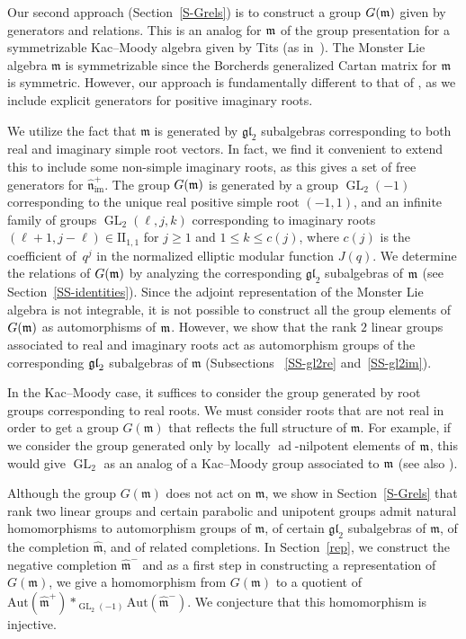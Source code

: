 \documentclass[11pt,letterpaper]{amsart}
\numberwithin{thecounter}{section}
\theoremstyle{definition}
\DeclareMathOperator{\GL}{GL}
\DeclareMathOperator{\ad}{ad}
\DeclareMathOperator{\im}{{im}}
\newcommand{\nhimp}{{\widehat{\mathfrak{n}}_{\im}^+}}
\begin{document}
Our second approach (Section~\ref{S-Grels}) is to construct a group $G(\frak m)$ given by generators and relations.  This is  an analog for $\frak m$ of  the group presentation for a symmetrizable Kac--Moody algebra given by Tits (as in~\cite{Ti87}).  The Monster Lie algebra $\mathfrak{m}$ is symmetrizable since the Borcherds generalized Cartan matrix for $\mathfrak{m}$ is symmetric. However, our approach is fundamentally different to that of \cite{Ti87}, as we include explicit generators for  positive imaginary roots.

We utilize the fact that $\mathfrak m$ is generated by $\mathfrak{gl}_2$ subalgebras corresponding to  both real and imaginary simple root vectors.
In fact, we find it convenient to extend this to include some non-simple imaginary roots, as this gives a set of free generators for $\nhimp$.
The group ${G}(\frak m)$ is generated by a group $\GL_2(-1)$ corresponding to the unique real positive simple root $(-1,1)$,  and an infinite family of groups $\GL_2(\ell,j,k)$ corresponding to imaginary  roots $(\ell+1,j-\ell)\in \text{II}_{1,1}$ for $j\geq 1$ and $1\leq k\leq c(j)$, where $c(j)$ is the coefficient of~$q^j$ in the normalized elliptic modular function $J(q)$. 
We determine the relations of $G(\frak m)$ by analyzing the corresponding $\mathfrak{gl}_2$ subalgebras of $\frak m$ (see Section~\ref{SS-identities}).
Since the adjoint representation of the Monster Lie algebra is not integrable, it is not possible to construct all the group elements of $G(\frak m)$ as automorphisms of $\frak m$. 
However, we show that the  rank \(2\) linear groups associated to
real and imaginary roots act as automorphism groups of the corresponding $\frak{gl}_2$ subalgebras of $\mathfrak{m}$ (Subsections ~\ref{SS-gl2re} and~\ref{SS-gl2im}).

In the Kac--Moody case, it suffices to consider the group generated by root groups corresponding to real roots. We must consider roots that are  not real in order to get a group $G(\mathfrak{m})$ that reflects the full structure of $\mathfrak{m}$.  For example, if we consider the group generated only by  locally $\ad$-nilpotent elements of $\frak{m}$, this would  give $\GL_2$ as an analog of a Kac--Moody group associated to $\frak{m}$ (see also \cite{Kum22}).



Although the group $G(\mathfrak m)$ does not act on $\mathfrak m$, 
we show in Section~\ref{S-Grels} that  rank two linear groups and certain
parabolic and unipotent groups admit natural homomorphisms to
automorphism groups of $\mathfrak m$, of certain
$\mathfrak{gl}_2$ subalgebras of $\mathfrak m$, of the completion
$\widehat{\mathfrak m}$, and of related completions.
In Section~\ref{rep}, we construct the negative completion $\widehat{\mathfrak{m}}^-$ and as a first step in  constructing a representation of $G(\mathfrak{m})$, we give a homomorphism from $G(\mathfrak{m})$ to a quotient of $\text{Aut}(\widehat{\mathfrak{m}}^+) *_{\GL_2(-1)} \text{Aut}(\widehat{\mathfrak{m}}^-).$
We conjecture that this homomorphism is injective.
 
\end{document}
